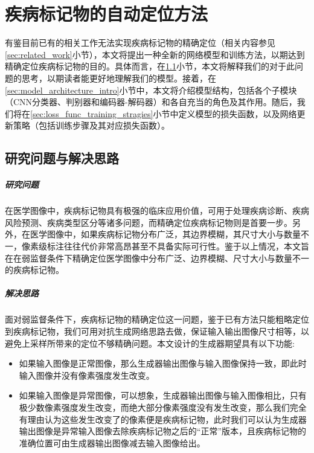 \chapter{疾病标记物的自动定位方法}\label{sec:method}

有鉴目前已有的相关工作无法实现疾病标记物的精确定位（相关内容参见\ref{sec:related_work}小节），本文将提出一种全新的网络模型和训练方法，以期达到精确定位疾病标记物的目的。具体而言，在\ref{sec:idea_thinking}小节，本文将解释我们的对于此问题的思考，以期读者能更好地理解我们的模型。接着，在\ref{sec:model_architecture_intro}小节中，本文将介绍模型结构，包括各个子模块（CNN分类器、判别器和编码器-解码器）和各自充当的角色及其作用。随后，我们将在\ref{sec:loss_func_training_stragies}小节中定义模型的损失函数，以及网络更新策略（包括训练步骤及其对应损失函数）。


\section{研究问题与解决思路}\label{sec:idea_thinking}
\paragraph{研究问题} 在医学图像中，疾病标记物具有极强的临床应用价值，可用于处理疾病诊断、疾病风险预测、疾病类型区分等诸多问题，而精确定位疾病标记物则是首要一步。另外，在医学图像中，如果疾病标记物分布广泛，其边界模糊，其尺寸大小与数量不一，像素级标注往往代价非常高昂甚至不具备实际可行性。鉴于以上情况，本文旨在在弱监督条件下精确定位医学图像中分布广泛、边界模糊、尺寸大小与数量不一的疾病标记物。

\paragraph{解决思路} 面对弱监督条件下，疾病标记物的精确定位这一问题，鉴于已有方法只能粗略定位到疾病标记物，我们可用对抗生成网络思路去做，保证输入输出图像尺寸相等，以避免上采样所带来的定位不够精确问题。本文设计的生成器期望具有以下功能:

\begin{itemize}
	\item 如果输入图像是正常图像，那么生成器输出图像与输入图像保持一致，即此时输入图像并没有像素强度发生改变。
	
	\item 如果输入图像是异常图像，可以想象，生成器输出图像与输入图像相比，只有极少数像素强度发生改变，而绝大部分像素强度没有发生改变，那么我们完全有理由认为这些发生改变了的像素便是疾病标记物，此时我们可以认为生成器输出图像是异常输入图像去除疾病标记物之后的“正常”版本，且疾病标记物的准确位置可由生成器输出图像减去输入图像给出。 
\end{itemize}

